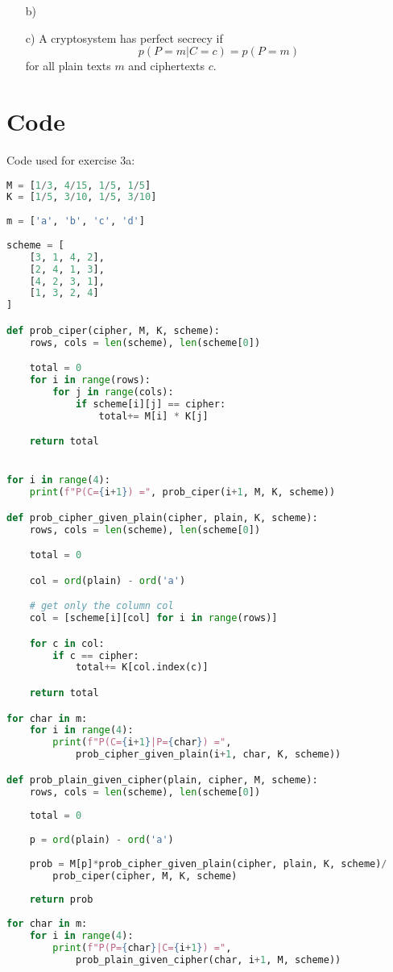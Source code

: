 \documentclass[10pt, oneside]{article}
\begin{document}
\begin{itemize}
    \item[b)]

    \item[c)] A cryptosystem has perfect secrecy if \[ p(P=m | C=c) = p(P=m) \] for all plain texts $m$ and ciphertexts $c$.

\end{itemize}


\appendix

\section{Code}

Code used for exercise 3a:
\begin{lstlisting}[language=Python]
M = [1/3, 4/15, 1/5, 1/5]
K = [1/5, 3/10, 1/5, 3/10]
    
m = ['a', 'b', 'c', 'd']
    
scheme = [
    [3, 1, 4, 2],
    [2, 4, 1, 3],
    [4, 2, 3, 1],
    [1, 3, 2, 4]
]

def prob_ciper(cipher, M, K, scheme):
    rows, cols = len(scheme), len(scheme[0])

    total = 0
    for i in range(rows):
        for j in range(cols):
            if scheme[i][j] == cipher:
                total+= M[i] * K[j]

    return total


for i in range(4):
    print(f"P(C={i+1}) =", prob_ciper(i+1, M, K, scheme))

def prob_cipher_given_plain(cipher, plain, K, scheme):
    rows, cols = len(scheme), len(scheme[0])

    total = 0

    col = ord(plain) - ord('a')

    # get only the column col
    col = [scheme[i][col] for i in range(rows)]

    for c in col:
        if c == cipher:
            total+= K[col.index(c)]

    return total

for char in m:
    for i in range(4):
        print(f"P(C={i+1}|P={char}) =", 
            prob_cipher_given_plain(i+1, char, K, scheme))

def prob_plain_given_cipher(plain, cipher, M, scheme):
    rows, cols = len(scheme), len(scheme[0])
    
    total = 0
    
    p = ord(plain) - ord('a')
    
    prob = M[p]*prob_cipher_given_plain(cipher, plain, K, scheme)/
        prob_ciper(cipher, M, K, scheme)
    
    return prob
    
for char in m:
    for i in range(4):
        print(f"P(P={char}|C={i+1}) =", 
            prob_plain_given_cipher(char, i+1, M, scheme))
\end{lstlisting}
\end{document}
